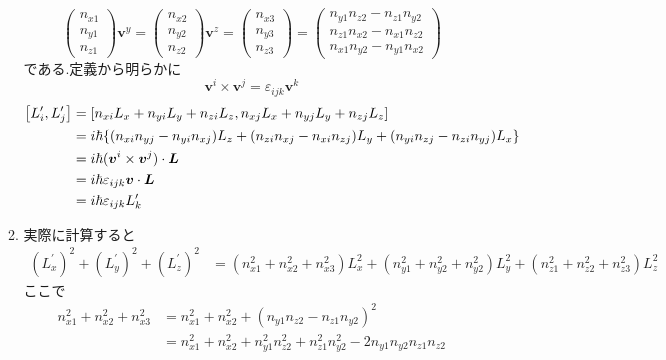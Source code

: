 \documentclass[uplatex,dvipdfmx, a4paper,11pt]{jsarticle}
\begin{document}
\begin{enumerate}[1.]
\begin{enumerate}[1）]
\begin{equation*}
\begin{pmatrix}
                n_{x1}\\n_{y1}\\n_{z1}
            \end{pmatrix}
            \bm{v}^y=
            \begin{pmatrix}
                n_{x2}\\n_{y2}\\n_{z2}
            \end{pmatrix}
            \bm{v}^z=
            \begin{pmatrix}
                n_{x3}\\n_{y3}\\n_{z3}
            \end{pmatrix}=
            \begin{pmatrix}
                n_{y1}n_{z2}-n_{z1}n_{y2}\\n_{z1}n_{x2}-n_{x1}n_{z2}\\n_{x1}n_{y2}-n_{y1}n_{x2}
            \end{pmatrix}
        \end{equation*}
        である.定義から明らかに
        \begin{equation}
            \bm{v}^i\times \bm{v}^j=\varepsilon_{ijk}\bm{v}^k
        \end{equation}
        \begin{align*}
            \qty[L_i^{\prime},L_j^{\prime}]&=\qty[n_{xi}L_x+n_{yi}L_y+n_{zi}L_z,n_{xj}L_x+n_{yj}L_y+n_{zj}L_z]\\
            &=i\hbar\qty{(n_{xi}n_{yj}-n_{yi}n_{xj})L_z+(n_{zi}n_{xj}-n_{xi}n_{zj})L_y+(n_{yi}n_{zj}-n_{zi}n_{yj})L_x}\\
            &=i\hbar(\bm{v}^i\times\bm{v}^j)\cdot\bm{L}\\
            &=i\hbar\varepsilon_{ijk}\bm{v}\cdot\bm{L}\\
            &=i\hbar\varepsilon_{ijk} L_k^{\prime}
        \end{align*}
        \item 実際に計算すると
        \begin{align*}
            (L_x^{\prime})^2+(L_y^{\prime})^2+(L_z^{\prime})^2&=(n_{x1}^2+n_{x2}^2+n_{x3}^2)L_x^2+(n_{y1}^2+n_{y2}^2+n_{y2}^2)L_y^2+(n_{z1}^2+n_{z2}^2+n_{z3}^2)L_z^2
        \end{align*}
        ここで
        \begin{align*}
            n_{x1}^2+n_{x2}^2+n_{x3}^2&=n_{x1}^2+n_{x2}^2+(n_{y1}n_{z2}-n_{z1}n_{y2})^2\\
            &=n_{x1}^2+n_{x2}^2+n_{y1}^2n_{z2}^2+n_{z1}^2n_{y2}^2-2n_{y1}n_{y2}n_{z1}n_{z2}

\end{align*}
\end{enumerate}
\end{enumerate}
\end{document}
